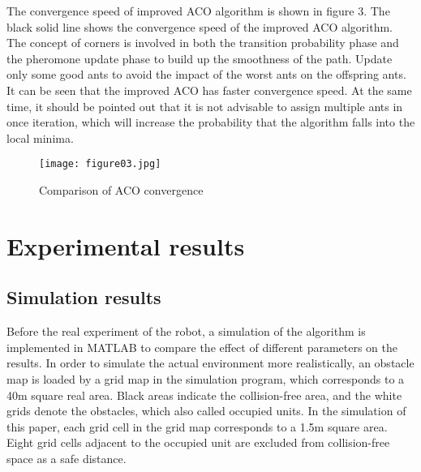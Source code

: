 \documentclass{iosart2c}
\begin{document}
The convergence speed of improved ACO algorithm is shown in figure $3$. The black solid line shows the convergence speed of the improved ACO algorithm. The concept of corners is involved in both the transition probability phase and the pheromone update phase to build up the smoothness of the path. Update only some good ants to avoid the impact of the worst ants on the offspring ants. It can be seen that the improved ACO has faster convergence speed. At the same time, it should be pointed out that it is not advisable to assign multiple ants in once iteration, which will increase the probability that the algorithm falls into the local minima.
\begin{figure}[hbp] %
\vspace{-0.2cm} 
\setlength{\abovecaptionskip}{0.1cm}  %
\texttt{[image: figure03.jpg]}
\caption{Comparison of ACO convergence}\label{f2}
\end{figure}

\section{Experimental results}\label{s4}
\subsection{Simulation results}\label{s4.1}
Before the real experiment of the robot, a simulation of the algorithm is implemented in MATLAB to compare the effect of different parameters on the results. In order to simulate the actual environment more realistically, an obstacle map is loaded by a grid map in the simulation program, which corresponds to a 40m square real area. Black areas indicate the collision-free area, and the white grids denote the obstacles, which also called occupied units. In the simulation of this paper, each grid cell in the grid map corresponds to a 1.5m square area. Eight grid cells adjacent to the occupied unit are excluded from collision-free space as a safe distance. 
\end{document}
